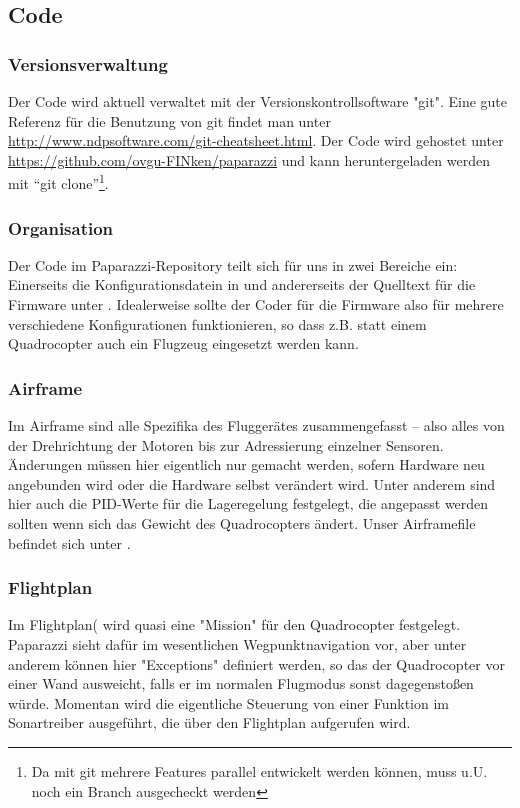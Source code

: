 \subsection{Code}

\subsubsection*{Versionsverwaltung}
Der Code wird aktuell verwaltet mit der Versionskontrollsoftware "git". 
Eine gute Referenz für die Benutzung von git findet man unter \url{http://www.ndpsoftware.com/git-cheatsheet.html}.
Der Code wird gehostet unter \url{https://github.com/ovgu-FINken/paparazzi} und kann heruntergeladen werden mit \enquote{git clone}\footnote{Da mit git mehrere Features parallel entwickelt werden können, muss u.U. noch ein Branch ausgecheckt werden}.

\subsubsection*{Organisation}

Der Code im Paparazzi-Repository teilt sich für uns in zwei Bereiche ein: Einerseits die Konfigurationsdatein in  und andererseits der Quelltext für die Firmware unter .
Idealerweise sollte der Coder für die Firmware also für mehrere verschiedene Konfigurationen funktionieren, so dass z.B. statt einem Quadrocopter auch ein Flugzeug eingesetzt werden kann.


\subsubsection*{Airframe}
Im Airframe sind alle Spezifika des Fluggerätes zusammengefasst – also alles von der Drehrichtung der Motoren bis zur Adressierung einzelner Sensoren.
Änderungen müssen hier eigentlich nur gemacht werden, sofern Hardware neu angebunden wird oder die Hardware selbst verändert wird.
Unter anderem sind hier auch die PID-Werte für die Lageregelung festgelegt, die angepasst werden sollten wenn sich das Gewicht des Quadrocopters ändert.
Unser Airframefile befindet sich unter .


\subsubsection*{Flightplan}
Im Flightplan( wird quasi eine "Mission" für den Quadrocopter festgelegt.
Paparazzi sieht dafür im wesentlichen Wegpunktnavigation vor, aber unter anderem können hier "Exceptions" definiert werden, so das der Quadrocopter vor einer Wand ausweicht, falls er im normalen Flugmodus sonst dagegenstoßen würde.
Momentan wird die eigentliche Steuerung von einer Funktion im Sonartreiber ausgeführt, die über den Flightplan aufgerufen wird.
